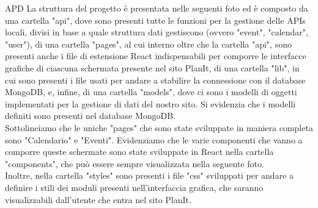 \begin{listaPersonale} {APD}
    La struttura del progetto è presentata nelle seguenti foto ed è composto da una cartella "api", dove sono presenti tutte le funzioni per la gestione delle APIs locali, divisi in base a quale struttura dati gestiscono (ovvero "event", "calendar", "user"), di una cartella "pages", al cui interno oltre che la cartella "api", sono presenti anche i file di estensione React indispensabili per comporre le interfacce grafiche di ciascuna schermata presente nel sito PlanIt, di una cartella "lib", in cui sono presenti i file usati per andare a stabilire la connessione con il database MongoDB, e, infine, di una cartella "models", dove ci sono i modelli di oggetti implementati per la gestione di dati del nostro sito. Si evidenzia che i modelli definiti sono presenti nel database MongoDB.\\
    Sottolineiamo che le uniche "pages" che sono state sviluppate in maniera completa sono "Calendario" e "Eventi". Evidenziamo che le varie componenti che vanno a comporre queste schermate sono state sviluppate in React nella cartella "components", che può essere sempre visualizzata nella seguente foto.\\
    Inoltre, nella cartella "styles" sono presenti i file "css" sviluppati per andare a definire i stili dei moduli presenti nell'interfaccia grafica, che saranno visualizzabili dall'utente che entra nel sito PlanIt.
    \begin{center}

\end{center}
\end{listaPersonale}
